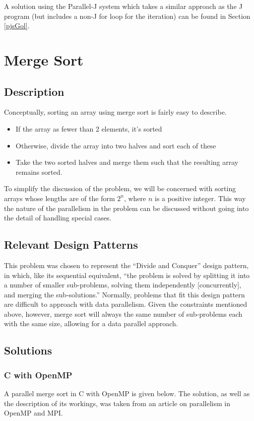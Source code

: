 A solution using the Parallel-J system which takes a similar approach as the J program 
(but includes a non-J for loop for the iteration)
can be found in Section \ref{pjsGol}.

\section{Merge Sort}
\subsection{Description}
Conceptually, sorting an array using merge sort is fairly easy to describe.

\begin{itemize}
	\item If the array as fewer than 2 elements, it's sorted
	\item Otherwise, divide the array into two halves and sort each of these
	\item Take the two sorted halves and merge them such that the resulting array remains sorted.
\end{itemize}

To simplify the discussion of the problem, 
we will be concerned with sorting arrays 
whose lengths are of the form $2^n$, where $n$ is a positive integer.
This way the nature of the parallelism in the problem can be discussed 
without going into the detail of handling special cases.

\subsection{Relevant Design Patterns}
This problem was chosen to represent the ``Divide and Conquer'' design pattern, \cite{mass}
in which, like its sequential equivalent,
``the problem is solved by splitting it into a number of smaller sub-problems, 
solving them independently [concurrently], and merging the sub-solutions.''
Normally, problems that fit this design pattern are difficult to approach with data parallelism.
Given the constraints mentioned above, however,
merge sort will always the same number of sub-problems each with the same size, 
allowing for a data parallel approach.

\subsection{Solutions}
\subsubsection{C with OpenMP}
A parallel merge sort in C with OpenMP is given below.
The solution, as well as the description of its workings, 
was taken from an article on parallelism in OpenMP and MPI\cite{mergeomp}.

